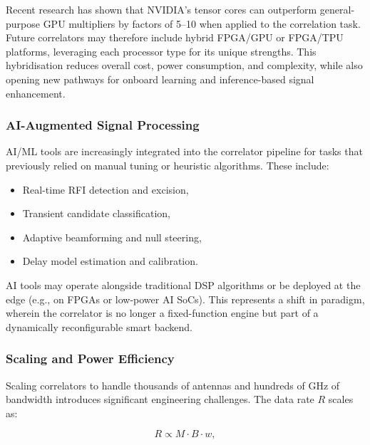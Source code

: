         Recent research has shown that NVIDIA's tensor cores can outperform general-purpose GPU multipliers by factors of 5–10 when applied to the correlation task. Future correlators may therefore include hybrid FPGA/GPU or FPGA/TPU platforms, leveraging each processor type for its unique strengths. This hybridisation reduces overall cost, power consumption, and complexity, while also opening new pathways for onboard learning and inference-based signal enhancement.

        \subsubsection{AI-Augmented Signal Processing}
        AI/ML tools are increasingly integrated into the correlator pipeline for tasks that previously relied on manual tuning or heuristic algorithms. These include:
        
        \begin{itemize}
            \item Real-time RFI detection and excision,
        
            \item Transient candidate classification,
            
            \item Adaptive beamforming and null steering,
            
            \item Delay model estimation and calibration.
        \end{itemize}

        AI tools may operate alongside traditional DSP algorithms or be deployed at the edge (e.g., on FPGAs or low-power AI SoCs). This represents a shift in paradigm, wherein the correlator is no longer a fixed-function engine but part of a dynamically reconfigurable smart backend.

        \subsubsection{Scaling and Power Efficiency}
        Scaling correlators to handle thousands of antennas and hundreds of GHz of bandwidth introduces significant engineering challenges. The data rate \( R \) scales as:

        \begin{equation}
            R \propto M \cdot B \cdot w,
        \end{equation}

